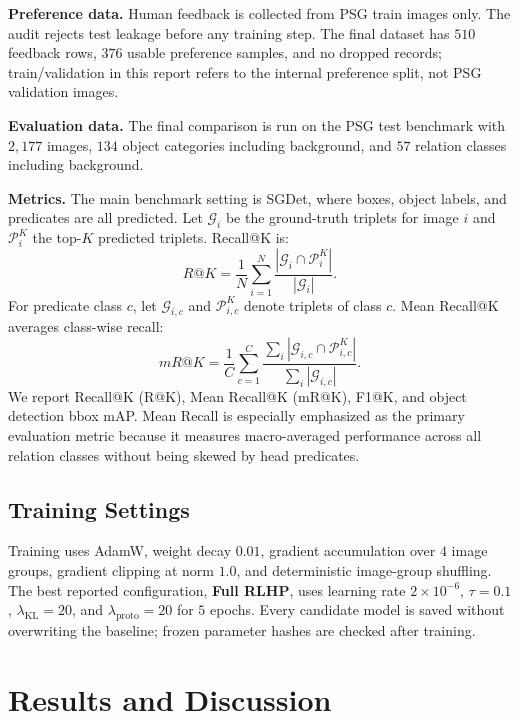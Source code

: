 \documentclass[10pt,twocolumn,letterpaper]{article}
\begin{document}
\textbf{Preference data.} Human feedback is collected from PSG train images only. The audit rejects test leakage before any training step. The final dataset has $510$ feedback rows, $376$ usable preference samples, and no dropped records; train/validation in this report refers to the internal preference split, not PSG validation images.

\textbf{Evaluation data.} The final comparison is run on the PSG test benchmark with $2,177$ images, $134$ object categories including background, and $57$ relation classes including background.

\textbf{Metrics.} The main benchmark setting is SGDet, where boxes, object labels, and predicates are all predicted. Let $\mathcal{G}_i$ be the ground-truth triplets for image $i$ and $\mathcal{P}^K_i$ the top-$K$ predicted triplets. Recall@K is:
\begin{equation}
    R@K = \frac{1}{N}\sum_{i=1}^{N}
    \frac{|\mathcal{G}_i \cap \mathcal{P}^K_i|}{|\mathcal{G}_i|}.
\end{equation}
For predicate class $c$, let $\mathcal{G}_{i,c}$ and $\mathcal{P}^K_{i,c}$ denote triplets of class $c$. Mean Recall@K averages class-wise recall:
\begin{equation}
    mR@K =
    \frac{1}{C}\sum_{c=1}^{C}
    \frac{\sum_i |\mathcal{G}_{i,c} \cap \mathcal{P}^K_{i,c}|}
         {\sum_i |\mathcal{G}_{i,c}|}.
\end{equation}
We report Recall@K (R@K), Mean Recall@K (mR@K), F1@K, and object detection bbox mAP. Mean Recall is especially emphasized as the primary evaluation metric because it measures macro-averaged performance across all relation classes without being skewed by head predicates.

\subsection{Training Settings}

Training uses AdamW, weight decay $0.01$, gradient accumulation over $4$ image groups, gradient clipping at norm $1.0$, and deterministic image-group shuffling. The best reported configuration, \textbf{Full RLHP}, uses learning rate $2\times10^{-6}$, $\tau=0.1$, $\lambda_{\mathrm{KL}}=20$, and $\lambda_{\mathrm{proto}}=20$ for $5$ epochs. Every candidate model is saved without overwriting the baseline; frozen parameter hashes are checked after training.

\section{Results and Discussion}
\label{sec:results}
\end{document}
